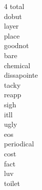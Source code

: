 \begin{multicols}{4}
	total\\ dobut\\ layer\\ place\\ goodnot\\ bare\\ chemical\\ dissapointe\\ tacky\\
	reapp\\ sigh\\ itll\\ ugly\\ eos\\ periodical\\ cost\\ fact\\ luv\\ toilet\\


\end{multicols}

